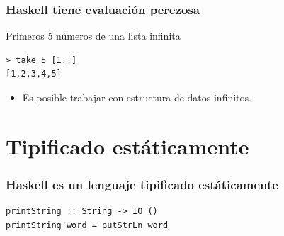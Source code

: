\documentclass{beamer}
\begin{document}

\begin{frame}[fragile]
  \frametitle{Haskell tiene evaluación perezosa}

Primeros 5 números de una lista infinita

\begin{lstlisting}[numbers=none, backgroundcolor=\color{lightgray}, keywordstyle=\color{black}]
> take 5 [1..]
[1,2,3,4,5]
\end{lstlisting}

\vspace{0.3cm}

\begin{itemize}
\item Es posible trabajar con estructura de datos infinitos. 
\end{itemize}

\end{frame}


\section{Tipificado estáticamente}

\begin{frame}[fragile]
  \frametitle{Haskell es un lenguaje tipificado estáticamente}

\begin{lstlisting}
printString :: String -> IO ()
printString word = putStrLn word
\end{lstlisting}

\end{frame}


\end{document}
